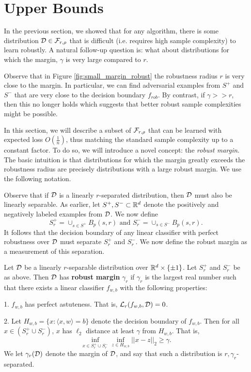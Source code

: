 \section{Upper Bounds}\label{sec:upper_bound}

In the previous section, we showed that for any algorithm, there is some distribution ${\mathcal D} \in {\mathcal F}_{r, \rho}$ that is difficult (i.e. requires high sample complexity) to learn robustly. A natural follow-up question is: what about distributions for which the margin, $\gamma$ is very large compared to $r$. 

Observe that in Figure \ref{fig:small_margin_robust} the robustness radius $r$ is very close to the margin. In particular, we can find adversarial examples from $S^+$ and $S^-$ that are very close to the decision boundary $f_{rob}$. By contrast, if $\gamma >> r$, then this no longer holds which suggests that better robust sample complexities might be possible.

In this section, we will describe a subset of ${\mathcal F}_{r, \rho}$ that can be learned with expected loss $O(\frac{1}{n})$, thus matching the standard sample complexity up to a constant factor. To do so, we will introduce a novel concept: the \textit{robust margin}. The basic intuition is that distributions for which the margin greatly exceeds the robustness radius are precisely distributions with a large robust margin. We use the following notation.

Observe that if ${\mathcal D}$ is a linearly $r$-separated distribution, then ${\mathcal D}$ must also be linearly separable. As earlier, let $S^+, S^- \subset \mathbb R^d$ denote the positively and negatively labeled examples from ${\mathcal D}$. We now define \begin{equation}\label{eqn:s_plus_s_minus} S_r^+ = \cup_{s \in S^+} B_p(s, r)\text{ and }S_r^{-} = \cup_{s \in S^-} B_p(s,r).\end{equation} It follows that the decision boundary of any linear classifier with perfect robustness over ${\mathcal D}$ must separate $S_r^+$ and $S_r^-$. We now define the robust margin as a measurement of this separation.

\begin{defn}\label{def:robust_margin}
Let ${\mathcal D}$ be a linearly $r$-separable distribution over $\mathbb R^d \times \{\pm 1\}$. Let $S_r^+$ and $S_r^-$ be as above. Then ${\mathcal D}$ has \textbf{robust margin} $\gamma_r$ if $\gamma_r$ is the largest real number such that there exists a linear classifier $f_{w,b}$ with the following properties: 

1. $f_{w,b}$ has perfect astuteness. That is, $\mathcal L_r(f_{w,b}, {\mathcal D}) = 0$. 

2. Let $H_{w,b} = \{x: \langle x, w \rangle = b\}$ denote the decision boundary of $f_{w,b}$. Then for all $x \in (S_r^+ \cup S_r^-)$, $x$ has $\ell_2$ distance at least $\gamma$ from $H_{w,b}$. That is, $$\inf_{x \in S_r^+ \cup S_r^-} \inf_{z \in H_{w,b}} ||x - z||_2 \geq \gamma.$$ We let $\gamma_r({\mathcal D})$ denote the margin of ${\mathcal D}$, and say that such a distribution is $r, \gamma_r$-separated. 
\end{defn}

